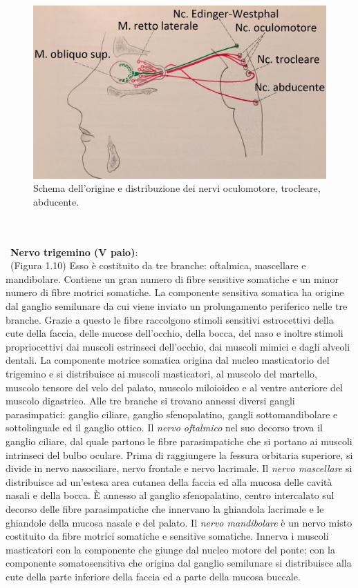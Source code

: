 \\\ \\\
\begin{figure}[h!]
	\centering
	\includegraphics[scale=0.15]{source/immagini/nervo_abducente.jpg}
	\caption[Origine III, IV, VI nervo cranico]{Schema dell'origine e distribuzione dei nervi oculomotore, trocleare, abducente.}
	\label{fig:test10}
\end{figure}
\\\ \\\ 
\textbf{Nervo trigemino (V paio)}: 
\\\ 
(Figura 1.10) Esso è costituito da tre branche: oftalmica, mascellare e mandibolare. Contiene un gran numero di fibre sensitive somatiche e un minor numero di fibre motrici somatiche. La componente sensitiva somatica ha origine dal ganglio semilunare da cui viene inviato un prolungamento periferico nelle tre branche. Grazie a questo le fibre raccolgono stimoli sensitivi estrocettivi della cute della faccia, delle mucose dell’occhio, della bocca, del naso e inoltre stimoli propriocettivi dai muscoli estrinseci dell’occhio, dai muscoli mimici e dagli alveoli dentali. La componente motrice somatica origina dal nucleo masticatorio del trigemino e si distribuisce ai muscoli masticatori, al muscolo del martello, muscolo tensore del velo del palato, muscolo miloioideo e al ventre anteriore del muscolo digastrico. 
Alle tre branche si trovano annessi diversi gangli parasimpatici: ganglio ciliare, ganglio sfenopalatino, gangli sottomandibolare e sottolinguale ed il ganglio ottico. 
Il \emph{nervo oftalmico} nel suo decorso trova il ganglio ciliare, dal quale partono le fibre parasimpatiche che si portano ai muscoli intrinseci del bulbo oculare. Prima di raggiungere la fessura orbitaria superiore, si divide in nervo nasociliare, nervo frontale e nervo lacrimale.
Il \emph{nervo mascellare} si distribuisce ad un’estesa area cutanea della faccia ed alla mucosa delle cavità nasali e della bocca. È annesso al ganglio sfenopalatino, centro intercalato sul decorso delle fibre parasimpatiche che innervano la ghiandola lacrimale e le ghiandole della mucosa nasale e del palato.
Il \emph{nervo mandibolare} è un nervo misto costituito da fibre motrici somatiche e sensitive somatiche. Innerva i muscoli masticatori con la componente che giunge dal nucleo motore del ponte; con la componente somatosensitiva che origina dal ganglio semilunare si distribuisce alla cute della parte inferiore della faccia ed a parte della mucosa buccale. 

